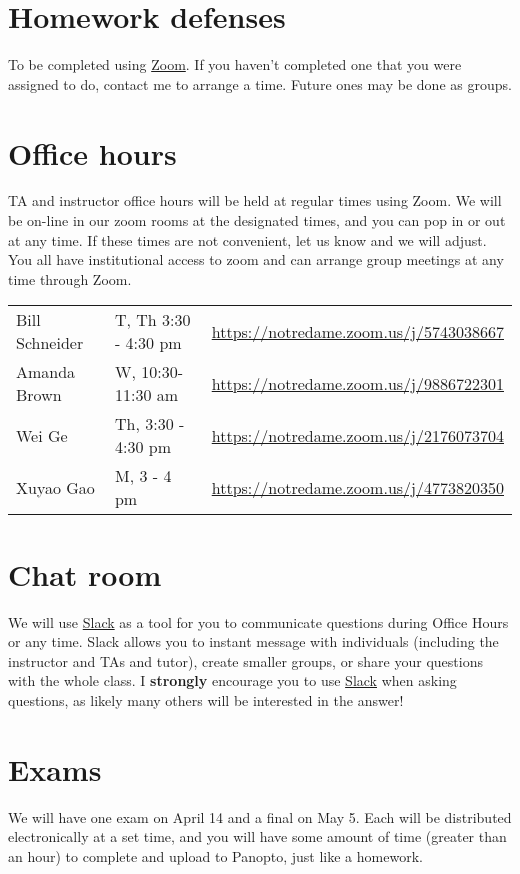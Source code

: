 \documentclass[11pt]{article}
\begin{document}
\section{Homework defenses}
\label{sec:orgaca57fe}
To be completed using \href{https://notredame.zoom.us/meeting}{Zoom}.  If you haven't completed one that you were assigned to do, contact me to arrange a time.  Future ones may be done as groups.

\section{Office hours}
\label{sec:org1db635c}
TA and instructor office hours will be held at regular times using Zoom.  We will be on-line in our zoom rooms at the designated times, and you can pop in or out at any time. If these times are not convenient, let us know and we will adjust. You all have institutional access to zoom and can arrange group meetings at any time through Zoom.

\begin{center}
\begin{tabular}{lll}
Bill Schneider & T, Th 3:30 - 4:30 pm & \url{https://notredame.zoom.us/j/5743038667}\\
Amanda Brown & W, 10:30- 11:30 am & \url{https://notredame.zoom.us/j/9886722301}\\
Wei Ge & Th, 3:30 - 4:30 pm & \url{https://notredame.zoom.us/j/2176073704}\\
Xuyao Gao & M, 3 - 4 pm & \url{https://notredame.zoom.us/j/4773820350}\\
\end{tabular}
\end{center}

\section{Chat room}
\label{sec:org07f1f05}
We will use \href{https://che30324-nd.slack.com}{Slack} as a tool for you to communicate questions during Office Hours or any time. Slack allows you to instant message with individuals (including the instructor and TAs and tutor), create smaller groups, or share your questions with the whole class. I \textbf{strongly} encourage you to use  \href{https://che30324-nd.slack.com}{Slack} when asking questions, as likely many others will be interested in the answer!


\section{Exams}
\label{sec:orge0efd48}
We will have one exam on April 14 and a final on May 5.  Each will be distributed electronically at a set time, and you will have some amount of time (greater than an hour) to complete and upload to Panopto, just like a homework.  
\end{document}
